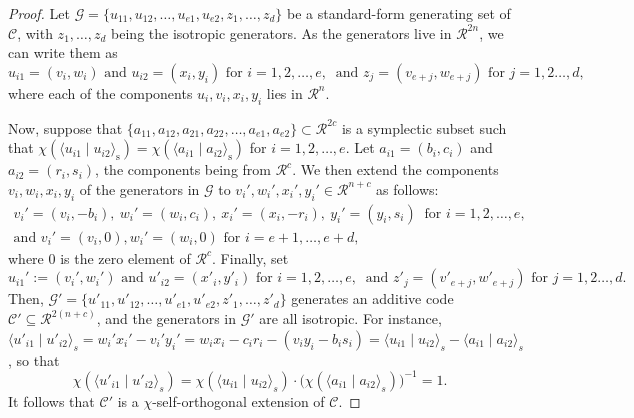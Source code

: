 \documentclass{article}
\theoremstyle{remark}
\theoremstyle{definition}
\numberwithin{equation}{section}
\begin{document}
 \begin{proof} Let $\mathcal{G} = \{u_{11},u_{12},\ldots,u_{e1},u_{e2},z_1,\ldots,z_d\}$ be a standard-form generating set of $\mathcal{C}$, with $z_1,\ldots,z_d$ being the isotropic generators. As the generators live in $\mathcal{R}^{2n}$, we can write them as
 $$
 u_{i1} = (v_i,w_i) \text{ and }  u_{i2} = (x_i,y_i) \text{ for } i = 1,2,\ldots,e,\ \text{ and }  z_j = (v_{e+j},w_{e+j}) \text{ for } j=1,2\ldots,d,
 $$
 where each of the components $u_i,v_i,x_i,y_i$ lies in $\mathcal{R}^n$. 
 
 Now, suppose that $\{a_{11},a_{12},a_{21},a_{22},\ldots,a_{e1},a_{e2}\} \subset \mathcal{R}^{2c}$ is a symplectic subset such that $\chi(\langle u_{i1} \mid u_{i2} \rangle_{\mathrm{s}}) = \chi(\langle a_{i1} \mid a_{i2} \rangle_{\mathrm{s}})$ for $i=1,2,\ldots,e$. Let $a_{i1} = (b_i,c_i)$ and $a_{i2} = (r_i,s_i)$, the components being from $\mathcal{R}^c$. We then extend the components $v_i,w_i,x_i,y_i$ of the generators in $\mathcal{G}$ to $v_i',w_i',x_i',y_i' \in \mathcal{R}^{n+c}$ as follows:
 \begin{gather}
 v_i' = (v_i,-b_i), \ w_i' = (w_i,c_i), \ x_i' = (x_i,-r_i),\ y_i' = (y_i,s_i) \ \text{ for } i = 1,2,\ldots,e, \label{eq:ext.1} \\
\text{and } v_i' = (v_i,0), w_i' = (w_i,0) \text{ for } i = e+1,\ldots,e+d, \label{eq:ext.2}
 \end{gather}
 where $0$ is the zero element of $\mathcal{R}^c$. Finally, set 
 \begin{equation}
 u_{i1}' := (v_i',w_i') \text{ and }  u'_{i2} = (x'_i,y'_i) \text{ for } i = 1,2,\ldots,e,\ \text{ and }  z'_j = (v'_{e+j},w'_{e+j}) \text{ for } j=1,2\ldots,d.
 \label{eq:ext.3}
 \end{equation}
 Then, $\mathcal{G}' = \{u'_{11},u'_{12},\ldots,u'_{e1},u'_{e2},z'_1,\ldots,z'_d\}$ generates an additive code $\mathcal{C}' \subseteq \mathcal{R}^{2(n+c)}$, and the generators in $\mathcal{G}'$ are all isotropic. For instance, $\langle u'_{i1} \mid u'_{i2}\rangle_s = w_i'x_i'-v_i'y_i' = w_ix_i-c_ir_i - (v_iy_i - b_is_i) = \langle u_{i1} \mid u_{i2}\rangle_s - \langle a_{i1} \mid a_{i2}\rangle_s$, so that 
 $$
 \chi(\langle u'_{i1} \mid u'_{i2}\rangle_s) = \chi(\langle u_{i1} \mid u_{i2}\rangle_s) \cdot \bigl(\chi(\langle a_{i1} \mid a_{i2}\rangle_s)\bigr)^{-1} = 1.
 $$ 
 It follows that $\mathcal{C}'$ is a $\chi$-self-orthogonal extension of $\mathcal{C}$.


\end{proof}
\end{document}
